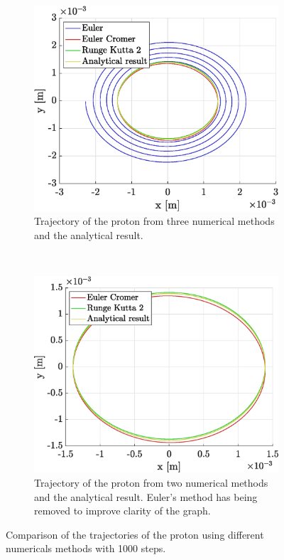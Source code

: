\documentclass[a4paper,12pt,twoside]{article}
\begin{document}
\begin{figure}[h]
	\centering
	\begin{subfigure}[t]{0.45\textwidth}
	\includegraphics[width=\linewidth]{graphs/ex2_ii_traj_ALL.eps}
		\caption{Trajectory of the proton from three numerical methods and the analytical result.}
		\label{fig:ex2-ii-traj-all}
	\end{subfigure}
	~
	\begin{subfigure}[t]{0.45\textwidth}
		\includegraphics[width=\linewidth]{graphs/ex2_ii_traj_NoEuler}
		\caption{Trajectory of the proton from two numerical methods and the analytical result. Euler's method has being removed to improve clarity of the graph.}
		\label{fig:ex2-ii-traj-NoEuler}
	\end{subfigure}

	\caption{Comparison of the trajectories of the proton using different numericals methods with \num{1000} steps.}
	\label{fig:ex2-ii-traj}
\end{figure}
\end{document}
